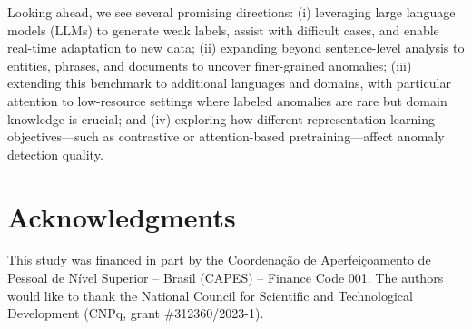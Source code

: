 \documentclass[12pt]{article}
\begin{document}
Looking ahead, we see several promising directions:
(i) leveraging large language models (LLMs) to generate weak labels, assist with difficult cases, and enable real-time adaptation to new data;
(ii) expanding beyond sentence-level analysis to entities, phrases, and documents to uncover finer-grained anomalies;
(iii) extending this benchmark to additional languages and domains, with particular attention to low-resource settings where labeled anomalies are rare but domain knowledge is crucial; and
(iv) exploring how different representation learning objectives—such as contrastive or attention-based pretraining—affect anomaly detection quality.

\section*{Acknowledgments}
\small
This study was financed in part by the Coordenação de Aperfeiçoamento de Pessoal de Nível Superior – Brasil (CAPES) – Finance Code 001. 
The authors would like to thank the National Council for Scientific and Technological Development (CNPq, grant \#312360/2023-1).
\normalsize




\clearpage
\end{document}
